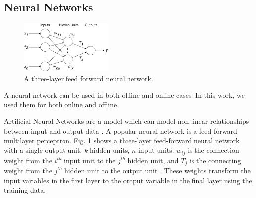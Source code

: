 %
%












\subsection{Neural Networks}


\begin{figure}
	\centering
	\includegraphics[width=0.4\textwidth]{Chapter5/figures/market-forecasting/methods/Kell_eEnergy_Fig1.eps}
	\caption{A three-layer feed forward neural network.}
	\label{fig:mlp}
\end{figure}

A neural network can be used in both offline and online cases. In this work, we used them for both online and offline.

Artificial Neural Networks are a model which can model non-linear relationships between input and output data \cite{Akaike1974}. A popular neural network is a feed-forward multilayer perceptron. Fig. \ref{fig:mlp} shows a three-layer feed-forward neural network with a single output unit, \textit{k} hidden units, $n$ input units. $w_{ij}$ is the connection weight from the $i^{th}$ input unit to the $j^{th}$ hidden unit,  and $T_j$ is the connecting weight from the $j^{th}$ hidden unit to the output unit \cite{Pao2007}. These weights transform the input variables in the first layer to the output variable in the final layer using the training data. 

